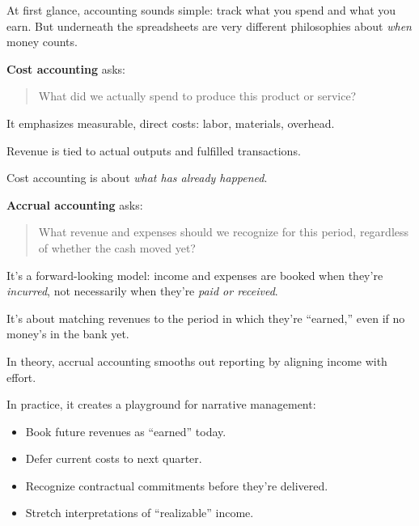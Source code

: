 \begin{tcolorbox}[colback=blue!5!white, colframe=blue!50!black, breakable,
  title={Historical Sidebar: Counting the Same Money Twice — Cost Accounting vs. Accrual Accounting}]

At first glance, accounting sounds simple: track what you spend and what you earn.  
But underneath the spreadsheets are very different philosophies about \textit{when} money counts.

\medskip

\textbf{Cost accounting} asks:  

\begin{quote}
What did we actually spend to produce this product or service?
\end{quote}

It emphasizes measurable, direct costs: labor, materials, overhead.  

\medskip

Revenue is tied to actual outputs and fulfilled transactions.  

\medskip

Cost accounting is about \textit{what has already happened}.

\medskip

\textbf{Accrual accounting} asks:  

\begin{quote}
What revenue and expenses should we recognize for this period, regardless of whether the cash moved yet?
\end{quote}

It’s a forward-looking model: income and expenses are booked when they’re \textit{incurred}, not necessarily when they’re \textit{paid or received}.  

\medskip

It’s about matching revenues to the period in which they’re “earned,” even if no money’s in the bank yet.

\medskip

In theory, accrual accounting smooths out reporting by aligning income with effort.  

\medskip

In practice, it creates a playground for narrative management:

\begin{itemize}
    \item Book future revenues as “earned” today.
    \item Defer current costs to next quarter.
    \item Recognize contractual commitments before they’re delivered.
    \item Stretch interpretations of “realizable” income.
\end{itemize}


\end{tcolorbox}

